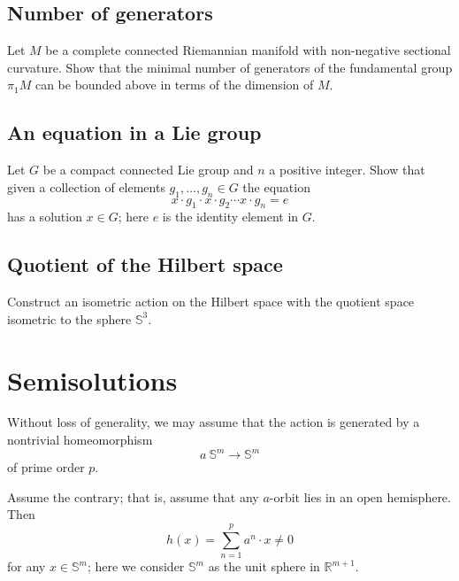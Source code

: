 \subsection*{Number of generators}\label{Number of generators}

\begin{pr}
Let $M$ be a complete connected Riemannian manifold with non-negative sectional curvature.
Show that the minimal number of generators of the fundamental group $\pi_1 M$
can be bounded above in terms of the dimension of $M$.
\end{pr}


\subsection*{An equation in a Lie group\easy}\label{Equations in the group}

\begin{pr}
Let $G$ be a compact connected Lie group and $n$ a positive integer.
Show that given a collection of elements $g_1,\dots,g_n\in G$
the equation 
\[x\cdot g_1\cdot x\cdot g_2\cdots x\cdot g_n=e\]
has a solution $x\in G$;
here $e$ is the identity element in $G$.
\end{pr}

\subsection*{Quotient of the Hilbert space\hard}\label{Quotient of Hilbert space}

\begin{pr}
Construct an isometric action on the Hilbert space with the quotient space isometric to the sphere $\mathbb{S}^3$.
\end{pr}

\section*{Semisolutions}
Without loss of generality, we may assume that the action is generated by a nontrivial homeomorphism 
\[a\:\mathbb{S}^m\to\mathbb{S}^m\] 
of prime order $p$.

Assume the contrary; that is, assume that any $a$-orbit lies in an open hemisphere.
Then 
\[h(x)=\sum_{n=1}^p a^n\cdot x\ne0\]
for any $x\in\mathbb{S}^m$; here we consider $\mathbb{S}^m$ as the unit sphere in $\mathbb{R}^{m+1}$.

